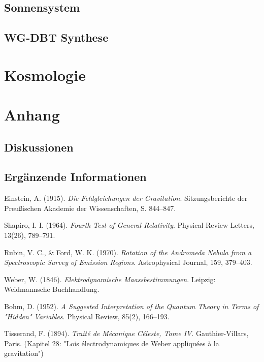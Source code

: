 \documentclass[10pt,oneside,openright]{book} %
\numberwithin{equation}{section}
\begin{document}
\chapter{Sonnensystem}
\label{chapter:sonnensystem}



\chapter{WG-DBT Synthese}

\part{Kosmologie}




\part{Anhang}
\chapter{Diskussionen}
\label{chapter:diskussion}

\chapter{Ergänzende Informationen}
\label{chapter:information}



\begin{thebibliography}{9}

Einstein, A. (1915). 
\textit{Die Feldgleichungen der Gravitation}. 
Sitzungsberichte der Preußischen Akademie der Wissenschaften, 
S. 844–847.

Shapiro, I. I. (1964). 
\textit{Fourth Test of General Relativity}. 
Physical Review Letters, 13(26), 789–791.

Rubin, V. C., \& Ford, W. K. (1970). 
\textit{Rotation of the Andromeda Nebula from a Spectroscopic Survey of Emission Regions}. 
Astrophysical Journal, 159, 379–403.

Weber, W. (1846). 
\textit{Elektrodynamische Maassbestimmungen}. 
Leipzig: Weidmannsche Buchhandlung.

Bohm, D. (1952). 
\textit{A Suggested Interpretation of the Quantum Theory in Terms of "Hidden" Variables}. 
Physical Review, 85(2), 166–193.

Tisserand, F. (1894). 
\textit{Traité de Mécanique Céleste, Tome IV}. 
Gauthier-Villars, Paris. 
(Kapitel 28: "Lois électrodynamiques de Weber appliquées à la gravitation")

\end{thebibliography}
\end{document}
